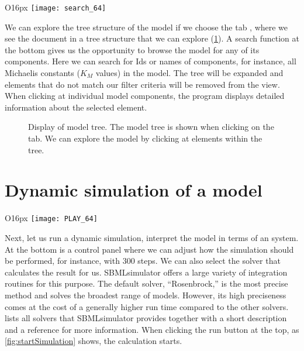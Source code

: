 \begin{wrapfigure}{O}{16px}
\texttt{[image: search\_64]}%
\end{wrapfigure}
We can explore the tree structure of the model if we choose the tab , where we see the \SBML document in a tree structure that we can explore (\cref{fig:modelTree}).
A search function at the bottom gives us the opportunity to browse the model for any of its components.
Here we can search for \acp{Id} or names of components, for instance, all Michaelis constants ($K_M$ values) in the model.
The tree will be expanded and elements that do not match our filter criteria will be removed from the view.
When clicking at individual model components, the program displays detailed information about the selected element.
\begin{figure}[t]
\centering
{}
\caption[Display of model tree]{Display of model tree.
The model tree is shown when clicking on the  tab.
We can explore the model by clicking at elements within the tree.}
\label{fig:modelTree}
\end{figure}


\section{Dynamic simulation of a model}
\begin{wrapfigure}{O}{16px}
\vspace{\wrapfigspace}
\texttt{[image: PLAY\_64]}
\end{wrapfigure}
Next, let us run a dynamic simulation, \ie interpret the model in terms of an \ODE system.
At the bottom is a control panel where we can adjust how the simulation should be performed, for instance, with 300 steps.
We can also select the solver that calculates the result for us.
SBMLsimulator offers a large variety of integration routines for this purpose.
The default solver, ``Rosenbrock,'' is the most precise method and solves the broadest range of models.
However, its high preciseness comes at the cost of a generally higher run time compared to the other solvers.
 lists all solvers that SBMLsimulator provides together with a short description and a reference for more information.
When clicking the run button at the top, as \cref{fig:startSimulation} shows, the calculation starts.

